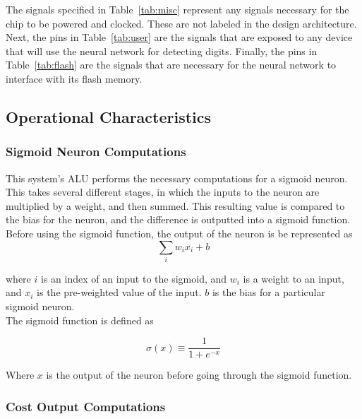 \documentclass[12pt]{article}
\begin{document}
The signals specified in Table~\ref{tab:misc} represent any signals necessary for the chip to be powered and clocked. These are not labeled in the design architecture. Next, the pins in Table~\ref{tab:user} are the signals that are exposed to any device that will use the neural network for detecting digits. Finally, the pins in Table~\ref{tab:flash} are the signals that are necessary for the neural network to interface with its flash memory.

\subsection{Operational Characteristics}

\subsubsection{Sigmoid Neuron Computations}

This system’s ALU performs the necessary computations for a sigmoid neuron. This takes several different stages, in which the inputs to the neuron are multiplied by a weight, and then summed. This resulting value is compared to the bias for the neuron, and the difference is outputted into a sigmoid function.\\

Before using the sigmoid function, the output of the neuron is be represented as\\

\begin{equation}\label{pre-sigmoid}
\sum_i w_ix_i  + b
\end{equation}

where $i$ is an index of an input to the sigmoid, and $w_i$ is a weight to an input, and $x_i$ is the pre-weighted value of the input. $b$ is the bias for a particular sigmoid neuron.\\

The sigmoid function is defined as

\begin{equation} \label{eq:sigmoid}
\sigma(x) \equiv \frac{1}{1+e^{-x}}
\end{equation}

Where $x$ is the output of the neuron before going through the sigmoid function.

\subsubsection{Cost Output Computations}
\end{document}

